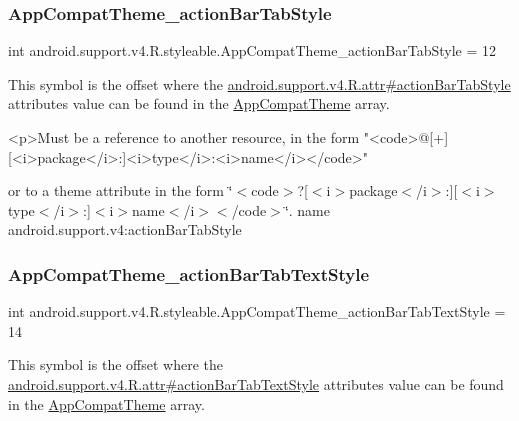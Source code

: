 \subsubsection{\texorpdfstring{App\+Compat\+Theme\+\_\+action\+Bar\+Tab\+Style}{AppCompatTheme\_actionBarTabStyle}}
{\footnotesize\ttfamily int android.\+support.\+v4.\+R.\+styleable.\+App\+Compat\+Theme\+\_\+action\+Bar\+Tab\+Style = 12\hspace{0.3cm}{\ttfamily [static]}}

This symbol is the offset where the \hyperlink{classandroid_1_1support_1_1v4_1_1R_1_1attr_aa87769ae4e0a2ee72da926a6cd712b3e}{android.\+support.\+v4.\+R.\+attr\#action\+Bar\+Tab\+Style} attribute\textquotesingle{}s value can be found in the \hyperlink{classandroid_1_1support_1_1v4_1_1R_1_1styleable_ac07ebbe62ed977f6dcaadc6397840ace}{App\+Compat\+Theme} array.

\begin{DoxyVerb}      <p>Must be a reference to another resource, in the form "<code>@[+][<i>package</i>:]<i>type</i>:<i>name</i></code>"
\end{DoxyVerb}
 or to a theme attribute in the form \char`\"{}$<$code$>$?\mbox{[}$<$i$>$package$<$/i$>$\+:\mbox{]}\mbox{[}$<$i$>$type$<$/i$>$\+:\mbox{]}$<$i$>$name$<$/i$>$$<$/code$>$\char`\"{}.  name android.\+support.\+v4\+:action\+Bar\+Tab\+Style \mbox{\label{classandroid_1_1support_1_1v4_1_1R_1_1styleable_af037c9c5d52f2269044bf14075a0a624}} 
\subsubsection{\texorpdfstring{App\+Compat\+Theme\+\_\+action\+Bar\+Tab\+Text\+Style}{AppCompatTheme\_actionBarTabTextStyle}}
{\footnotesize\ttfamily int android.\+support.\+v4.\+R.\+styleable.\+App\+Compat\+Theme\+\_\+action\+Bar\+Tab\+Text\+Style = 14\hspace{0.3cm}{\ttfamily [static]}}

This symbol is the offset where the \hyperlink{classandroid_1_1support_1_1v4_1_1R_1_1attr_a75300bda33f07c53e6884aa5ba0c739e}{android.\+support.\+v4.\+R.\+attr\#action\+Bar\+Tab\+Text\+Style} attribute\textquotesingle{}s value can be found in the \hyperlink{classandroid_1_1support_1_1v4_1_1R_1_1styleable_ac07ebbe62ed977f6dcaadc6397840ace}{App\+Compat\+Theme} array.

